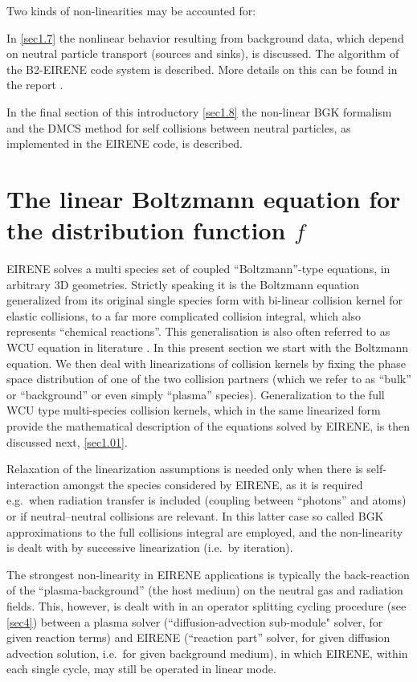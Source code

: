 Two kinds of non-linearities may be accounted for:

In \cref{sec1.7} the nonlinear behavior resulting from background data, which
depend on neutral particle transport (sources and sinks), is discussed.
The algorithm of the B2-EIRENE code system \cite{kn:Reiter92b} is described.
More details on this can be found in the report \cite{kn:Maddison94}.

In the final section of this introductory \cref{sec1.8} the non-linear \ac{BGK}
formalism and the \ac{DMCS} method for self collisions between neutral
particles, as implemented in the EIRENE code, is described.

\newpage

\section{The linear Boltzmann equation for the distribution function
  \texorpdfstring{$f$}{f}} \label{sec1.0}

EIRENE solves a multi species set of coupled ``Boltzmann''-type equations, in
arbitrary 3D geometries.
Strictly speaking it is the Boltzmann equation generalized from its original
single species form with bi-linear collision kernel for elastic collisions, to
a far more complicated collision integral, which also represents  ``chemical
reactions''.
This generalisation is also often referred to as \ac{WCU} equation in
literature \cite{kn:WCU}.
In this present section we start with the Boltzmann equation.
We then deal with linearizations of collision kernels by fixing the phase space
distribution of one of the two collision partners (which we refer to as
``bulk'' or ``background'' or even simply ``plasma'' species).
Generalization to the full \ac{WCU} type multi-species collision kernels, which
in the same linearized form provide the mathematical description of the
equations solved by EIRENE, is then discussed next, \cref{sec1.01}.

Relaxation of the linearization assumptions is needed only when there is
self-interaction amongst the species considered by EIRENE, as it is required
e.g.\ when radiation transfer is included (coupling between ``photons'' and
atoms) or if neutral--neutral collisions are relevant.
In this latter case so called \ac{BGK} approximations to the full collisions
integral are employed, and the non-linearity is dealt with by successive
linearization (i.e.\ by iteration).

The strongest non-linearity in EIRENE applications is typically the
back-reaction of the ``plasma-background'' (the host medium) on the neutral gas
and radiation fields.
This, however, is dealt with in an operator splitting cycling procedure (see
\cref{sec4}) between a plasma solver (``di\-ffu\-sion-advection sub-module"
solver, for given reaction terms) and EIRENE (``reaction part'' solver, for
given diffusion advection solution, i.e.\ for given background medium), in
which EIRENE, within each single cycle, may still be operated in linear mode.


